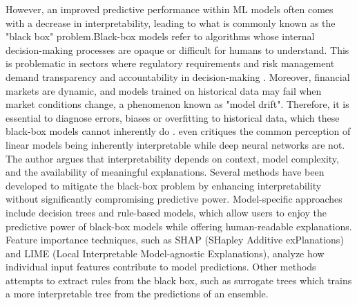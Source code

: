 However, an improved predictive performance within ML models often comes with a decrease in interpretability,  leading to what is commonly known as the "black box" problem.Black-box models refer to algorithms whose internal decision-making processes are opaque or difficult for humans to understand. This is problematic in sectors where regulatory requirements and risk management demand transparency and accountability in decision-making \cite{brozek_2024}.  Moreover, financial markets are dynamic, and models trained on historical data may fail when market conditions change, a phenomenon known as "model drift". Therefore, it is essential to diagnose errors, biases or overfitting to historical data, which these black-box models cannot inherently do \cite{cohen_2021}.  even critiques the common perception of linear models being inherently interpretable while deep neural networks are not. The author argues that interpretability depends on context, model complexity, and the availability of meaningful explanations. Several methods have been developed to mitigate the black-box problem by enhancing interpretability without significantly compromising predictive power. Model-specific approaches include decision trees and rule-based models, which allow users to enjoy the predictive power of black-box models while offering human-readable explanations. Feature importance techniques, such as SHAP (SHapley Additive exPlanations) and LIME (Local Interpretable Model-agnostic Explanations), analyze how individual input features contribute to model predictions. Other methods attempts to extract rules from the black box, such as surrogate trees which trains a more interpretable tree from the predictions of an ensemble. 



